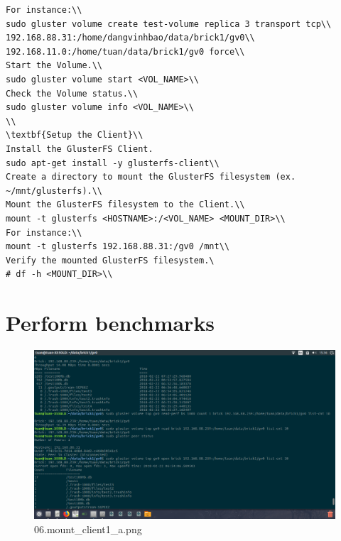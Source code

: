 \documentclass{article}
\begin{document}
\begin{lstlisting}
For instance:\\
sudo gluster volume create test-volume replica 3 transport tcp\\ 192.168.88.31:/home/dangvinhbao/data/brick1/gv0\\ 192.168.11.0:/home/tuan/data/brick1/gv0 force\\
Start the Volume.\\
sudo gluster volume start <VOL_NAME>\\
Check the Volume status.\\
sudo gluster volume info <VOL_NAME>\\
\\
\textbf{Setup the Client}\\
Install the GlusterFS Client.
sudo apt-get install -y glusterfs-client\\
Create a directory to mount the GlusterFS filesystem (ex. ~/mnt/glusterfs).\\
Mount the GlusterFS filesystem to the Client.\\
mount -t glusterfs <HOSTNAME>:/<VOL_NAME> <MOUNT_DIR>\\
For instance:\\
mount -t glusterfs 192.168.88.31:/gv0 /mnt\\
Verify the mounted GlusterFS filesystem.\
# df -h <MOUNT_DIR>\\
\end{lstlisting}

\section{Perform benchmarks}

\begin{figure}[h!]
\centering
\includegraphics[scale=0.5]{06.mount_client1_a.png}
\caption{06.mount_client1_a.png}
\label{fig:glusterfsfigure}
\end{figure}
\end{document}
